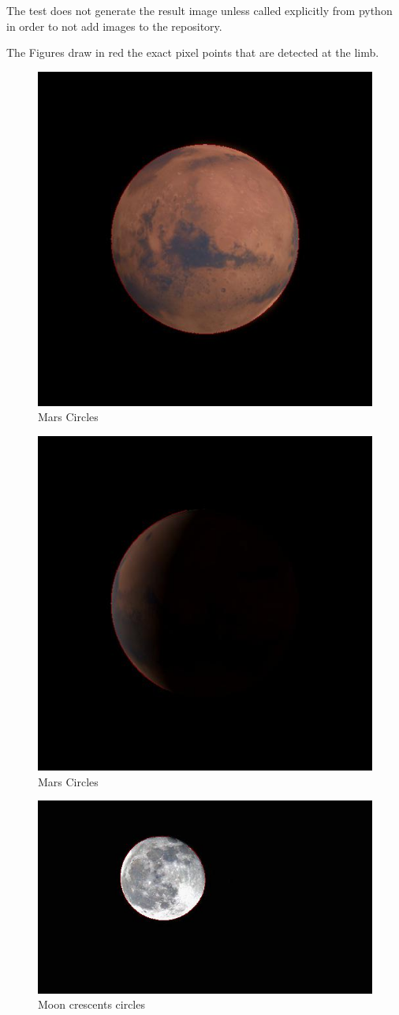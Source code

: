 The test does not generate the result image unless called explicitly from python in order to not add images to the repository.

The Figures draw in red the exact pixel points that are detected at the limb. 

\begin{figure}[h!]
\centering
  \includegraphics[width = 0.5\linewidth]{../_UnitTest/result_MarsBright.jpg}
  \caption{Mars Circles}
  \label{fig:mars}
\end{figure}

\begin{figure}[h!]
\centering
  \includegraphics[width = 0.5\linewidth]{../_UnitTest/result_MarsDark.jpg}
  \caption{Mars Circles}
  \label{fig:mars}
\end{figure}

\begin{figure}[h!]
\centering
  \includegraphics[width = 0.5\linewidth]{../_UnitTest/result_moons.jpg}
  \caption{Moon crescents circles}
  \label{fig:moons}
\end{figure}

